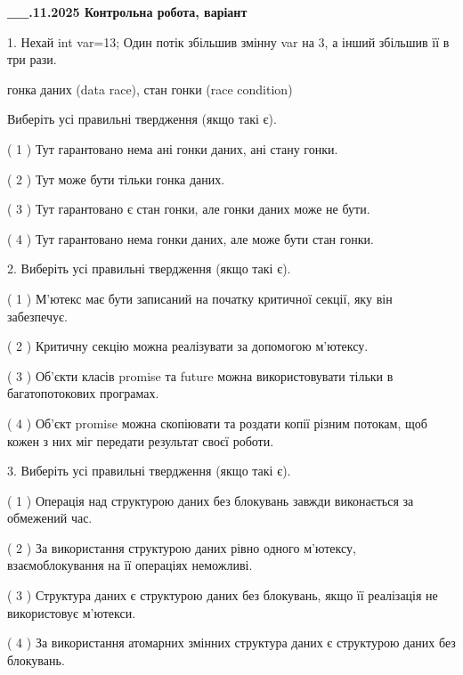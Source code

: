 \documentclass[12pt, ukrainian]{article}
\begin{document}
\newpage
\begin {large}

\textbf{\_\_.11.2025 Контрольна робота, варіант  }\par


{
1. Нехай int var=13; Один потік збільшив змінну var на 3, а інший збільшив її в три рази.

гонка даних (data race), стан гонки (race condition)

Виберіть усі правильні твердження (якщо такі є).\par
\vspace{2mm}
( 1 ) Тут гарантовано нема ані гонки даних, ані стану гонки.%

( 2 ) Тут може бути тільки гонка даних.%

( 3 ) Тут гарантовано є стан гонки, але гонки даних може не бути.%

( 4 ) Тут гарантовано нема гонки даних, але може бути стан гонки.%


2. Виберіть усі правильні твердження (якщо такі є).\par
\vspace{2mm}

( 1 ) М’ютекс має бути записаний на початку критичної секції, яку він забезпечує.%

( 2 ) Критичну секцію можна реалізувати за допомогою м’ютексу.%

( 3 ) Об’єкти класів promise та future можна використовувати тільки в багатопотокових програмах.%

( 4 ) Об’єкт promise можна скопіювати та роздати копії різним потокам, щоб кожен з них міг передати результат своєї роботи.%


3. Виберіть усі правильні твердження (якщо такі є).\par
\vspace{2mm}

( 1 ) Операція над структурою даних без блокувань завжди виконається за обмежений час.%

( 2 ) За використання структурою даних рівно одного м’ютексу, взаємоблокування на її операціях неможливі.%

( 3 ) Структура даних є структурою даних без блокувань, якщо її реалізація не використовує м’ютекси.%

( 4 ) За використання атомарних змінних структура даних є структурою даних без блокувань.%


}
\end{large}
\end{document}
